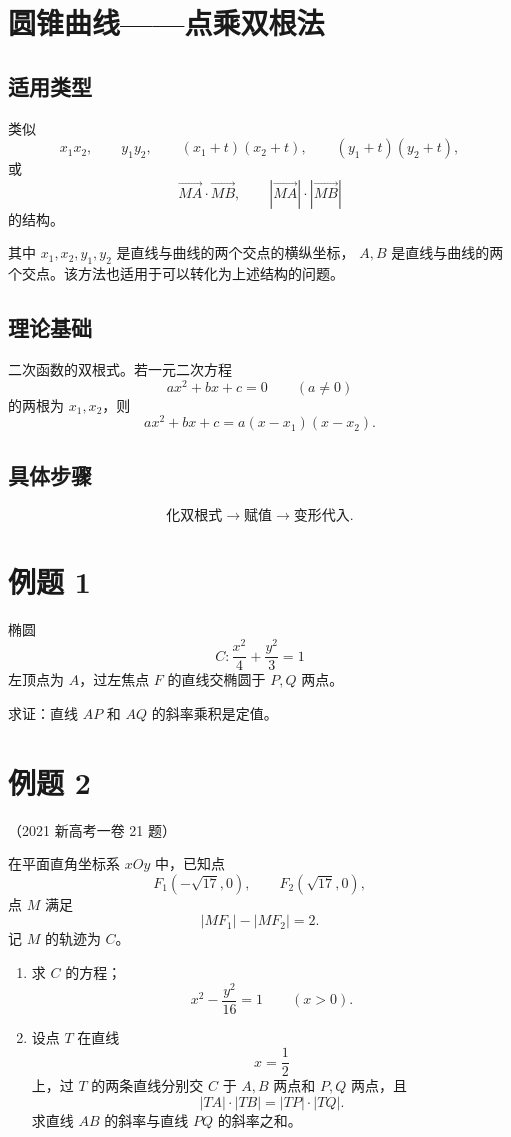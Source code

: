 \documentclass{ctexart}
\begin{document}
	\section*{圆锥曲线——点乘双根法}

\subsection*{适用类型}

类似
\[
x_1x_2,\qquad y_1y_2,\qquad (x_1+t)(x_2+t),\qquad (y_1+t)(y_2+t),
\]
或
\[
\overrightarrow{MA}\cdot\overrightarrow{MB},\qquad
|\overrightarrow{MA}|\cdot|\overrightarrow{MB}|
\]
的结构。

其中 $x_1,x_2,y_1,y_2$ 是直线与曲线的两个交点的横纵坐标，
$A,B$ 是直线与曲线的两个交点。该方法也适用于可以转化为上述结构的问题。

\subsection*{理论基础}

二次函数的双根式。若一元二次方程
\[
ax^2+bx+c=0\qquad (a\ne 0)
\]
的两根为 $x_1,x_2$，则
\[
ax^2+bx+c=a(x-x_1)(x-x_2).
\]

\subsection*{具体步骤}

\[
\text{化双根式}\longrightarrow \text{赋值}\longrightarrow \text{变形代入}.
\]

\section*{例题 1}

椭圆
\[
C:\frac{x^2}{4}+\frac{y^2}{3}=1
\]
左顶点为 $A$，过左焦点 $F$ 的直线交椭圆于 $P,Q$ 两点。

求证：直线 $AP$ 和 $AQ$ 的斜率乘积是定值。

\section*{例题 2}

（2021 新高考一卷 21 题）

在平面直角坐标系 $xOy$ 中，已知点
\[
F_1(-\sqrt{17},0),\qquad F_2(\sqrt{17},0),
\]
点 $M$ 满足
\[
|MF_1|-|MF_2|=2.
\]
记 $M$ 的轨迹为 $C$。

\begin{enumerate}
  \item 求 $C$ 的方程；
  \[
  x^2-\frac{y^2}{16}=1\qquad (x>0).
  \]

  \item 设点 $T$ 在直线
  \[
  x=\frac12
  \]
  上，过 $T$ 的两条直线分别交 $C$ 于 $A,B$ 两点和 $P,Q$ 两点，且
  \[
  |TA|\cdot|TB|=|TP|\cdot|TQ|.
  \]
  求直线 $AB$ 的斜率与直线 $PQ$ 的斜率之和。
\end{enumerate}
\end{document}
